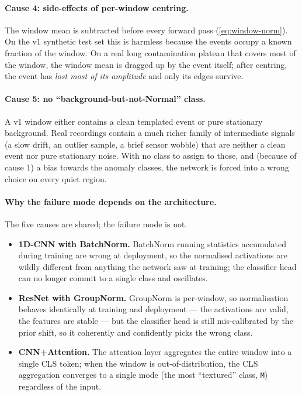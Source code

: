 \paragraph{Cause 4: side-effects of per-window centring.} The window
mean is subtracted before every forward pass (\cref{eq:window-norm}).
On the v1 synthetic test set this is harmless because the events
occupy a known fraction of the window. On a real long contamination
plateau that covers most of the window, the window mean is dragged up
by the event itself; after centring, the event has \emph{lost most of
its amplitude} and only its edges survive.

\paragraph{Cause 5: no ``background-but-not-Normal'' class.} A v1
window either contains a clean templated event or pure stationary
background. Real recordings contain a much richer family of
intermediate signals (a slow drift, an outlier sample, a brief sensor
wobble) that are neither a clean event nor pure stationary noise. With
no class to assign to those, and (because of cause 1) a bias towards
the anomaly classes, the network is forced into a wrong choice on
every quiet region.

\paragraph{Why the failure mode depends on the architecture.} The five
causes are shared; the failure mode is not.
\begin{itemize}[leftmargin=*, itemsep=0.2em]
    \item \textbf{1D-CNN with BatchNorm.} BatchNorm running statistics
    accumulated during training are wrong at deployment, so the
    normalised activations are wildly different from anything the
    network saw at training; the classifier head can no longer commit
    to a single class and oscillates.
    \item \textbf{ResNet with GroupNorm.} GroupNorm is per-window, so
    normalisation behaves identically at training and deployment ---
    the activations are valid, the features are stable --- but the
    classifier head is still mis-calibrated by the prior shift, so it
    coherently and confidently picks the wrong class.
    \item \textbf{CNN+Attention.} The attention layer aggregates the
    entire window into a single CLS token; when the window is
    out-of-distribution, the CLS aggregation converges to a single
    mode (the most ``textured'' class, \texttt{M}) regardless of the
    input.
\end{itemize}

